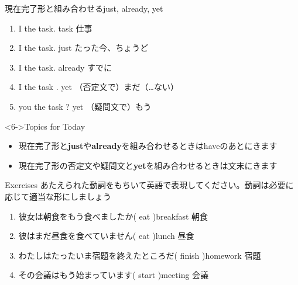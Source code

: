 \documentclass[aspectratio=169,xcolor={dvipsnames,table}]{beamer}
\begin{document}
\begin{frame}[plain]{現在完了形と組み合わせるjust, already, yet}
\begin{enumerate}
 \item<1-> I  the task.%
\hfill{}{\scriptsize task  仕事}
 \item<2-> I    the task.%
\hfill{}{\scriptsize just  たった今、ちょうど}
 \item<3-> I    the task.%
\hfill{}{\scriptsize already  すでに}
 \item<4-> I    the task .%
\hfill{}{\scriptsize yet  （否定文で）まだ（\ldots ない）}
 \item<5->  you  the task ?%
\hfill{}{\scriptsize yet  （疑問文で）もう}
\end{enumerate}

\bigskip

 \begin{exampleblock}<6->{Topics for Today}
\small
\begin{itemize}[square]\small
 \item 現在完了形と\textbf{just}や\textbf{already}を組み合わせるときはhaveのあとにきます
 \item 現在完了形の否定文や疑問文と\textbf{yet}を組み合わせるときは文末にきます
\end{itemize}
      \end{exampleblock}
\end{frame}
\begin{frame}[plain]{Exercises}
 あたえられた動詞をもちいて英語で表現してください。動詞は必要に応じて適当な形にしましょう

\begin{enumerate}
 \item 彼女は朝食をもう食べましたか( eat )\hfill{\scriptsize breakfast  朝食}\\
 \item 彼はまだ昼食を食べていません( eat )\hfill{\scriptsize lunch  昼食}\\
 \item わたしはたったいま宿題を終えたところだ( finish )\hfill{\scriptsize homework  宿題}\\
 \item その会議はもう始まっています( start )\hfill{\scriptsize meeting  会議}\\
\end{enumerate}
\end{frame}
\end{document}

